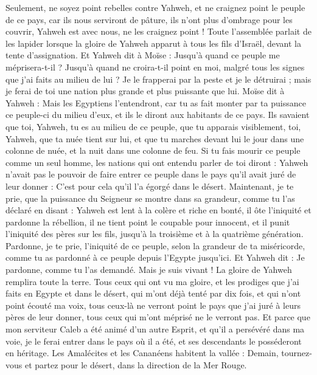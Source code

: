 \begin{multicols}{2}
Seulement, ne soyez point rebelles contre Yahweh, et ne craignez point le peuple de ce pays, car ils nous serviront de pâture, ils n’ont plus d’ombrage pour les couvrir, Yahweh est avec nous, ne les craignez point !
Toute l'assemblée parlait de les lapider lorsque la gloire de Yahweh apparut à tous les fils d'Israël, devant la tente d'assignation.
Et Yahweh dit à Moïse : Jusqu’à quand ce peuple me méprisera-t-il ? Jusqu’à quand ne croira-t-il point en moi, malgré tous les signes que j'ai faits au milieu de lui ?
Je le frapperai par la peste et je le détruirai ; mais je ferai de toi une nation plus grande et plus puissante que lui.
Moïse dit à Yahweh : Mais les Egyptiens l'entendront, car tu as fait monter par ta puissance ce peuple-ci du milieu d'eux,
et ils le diront aux habitants de ce pays. Ils savaient que toi, Yahweh, tu es au milieu de ce peuple, que tu apparais visiblement, toi, Yahweh, que ta nuée tient sur lui, et que tu marches devant lui le jour dans une colonne de nuée, et la nuit dans une colonne de feu.
Si tu fais mourir ce peuple comme un seul homme, les nations qui ont entendu parler de toi diront :
Yahweh n’avait pas le pouvoir de faire entrer ce peuple dans le pays qu’il avait juré de leur donner : C’est pour cela qu’il l’a égorgé dans le désert.
Maintenant, je te prie, que la puissance du Seigneur se montre dans sa grandeur, comme tu l’as déclaré en disant :
Yahweh est lent à la colère et riche en bonté, il ôte l'iniquité et pardonne la rébellion, il ne tient point le coupable pour innocent, et il punit l'iniquité des pères sur les fils, jusqu'à la troisième et à la quatrième génération.
Pardonne, je te prie, l'iniquité de ce peuple, selon la grandeur de ta miséricorde, comme tu as pardonné à ce peuple depuis l'Egypte jusqu'ici.
Et Yahweh dit : Je pardonne, comme tu l’as demandé.
Mais je suis vivant ! La gloire de Yahweh remplira toute la terre.
Tous ceux qui ont vu ma gloire, et les prodiges que j'ai faits en Egypte et dans le désert, qui m'ont déjà tenté par dix fois, et qui n’ont point écouté ma voix,
tous ceux-là ne verront point le pays que j'ai juré à leurs pères de leur donner, tous ceux qui m'ont méprisé ne le verront pas.
Et parce que mon serviteur Caleb a été animé d'un autre Esprit, et qu'il a persévéré dans ma voie, je le ferai entrer dans le pays où il a été, et ses descendants le posséderont en héritage.
Les Amalécites et les Cananéens habitent la vallée : Demain, tournez-vous et partez pour le désert, dans la direction de la Mer Rouge.

\end{multicols}
